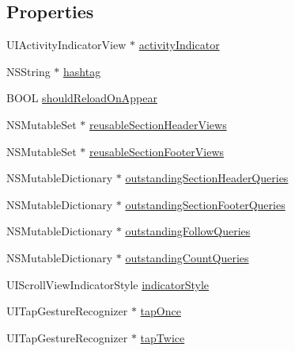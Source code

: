 \subsection*{Properties}
\begin{DoxyCompactItemize}
\item 
U\+I\+Activity\+Indicator\+View $\ast$ \hyperlink{interface_e_s_popular_view_controller_a7855b834d8db33ccdf17de918067c980}{activity\+Indicator}
\item 
N\+S\+String $\ast$ \hyperlink{interface_e_s_popular_view_controller_a2e3c2985261b1af4e96f72cf6f7d98c4}{hashtag}
\item 
B\+O\+O\+L \hyperlink{interface_e_s_popular_view_controller_a9def789d7872f4d80f7218f6cca40f96}{should\+Reload\+On\+Appear}
\item 
N\+S\+Mutable\+Set $\ast$ \hyperlink{interface_e_s_popular_view_controller_ababc6cca18647ce1312ee3ad29d13475}{reusable\+Section\+Header\+Views}
\item 
N\+S\+Mutable\+Set $\ast$ \hyperlink{interface_e_s_popular_view_controller_a953314997f08a2a573390a975dddf13a}{reusable\+Section\+Footer\+Views}
\item 
N\+S\+Mutable\+Dictionary $\ast$ \hyperlink{interface_e_s_popular_view_controller_a594b3d651a41e433f2770b161e8f201b}{outstanding\+Section\+Header\+Queries}
\item 
N\+S\+Mutable\+Dictionary $\ast$ \hyperlink{interface_e_s_popular_view_controller_a0e66ab4dae466e904f3fa4140faa23dc}{outstanding\+Section\+Footer\+Queries}
\item 
N\+S\+Mutable\+Dictionary $\ast$ \hyperlink{interface_e_s_popular_view_controller_a6b197bf73c9e2c4c2900f4def0912de7}{outstanding\+Follow\+Queries}
\item 
N\+S\+Mutable\+Dictionary $\ast$ \hyperlink{interface_e_s_popular_view_controller_aefe219eede170e97658eba2288fe1a89}{outstanding\+Count\+Queries}
\item 
U\+I\+Scroll\+View\+Indicator\+Style \hyperlink{interface_e_s_popular_view_controller_ab7824b8490f12e59a148786899743e25}{indicator\+Style}
\item 
U\+I\+Tap\+Gesture\+Recognizer $\ast$ \hyperlink{interface_e_s_popular_view_controller_adfe38ee30e074408c28b0decd81300fc}{tap\+Once}
\item 
U\+I\+Tap\+Gesture\+Recognizer $\ast$ \hyperlink{interface_e_s_popular_view_controller_a528b61c52344c48fdb8b34c522722b98}{tap\+Twice}
\end{DoxyCompactItemize}



